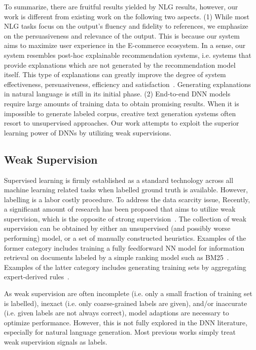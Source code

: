 \documentclass[sigconf]{acmart}
\begin{document}
To summarize, there are fruitful results yielded by NLG results, however, our work is different from existing work on the following two aspects. (1) While most NLG tasks focus on the output's fluency and fidelity to references, we emphasize on the persuasiveness and relevance of the output.  This is because our system aims to maximize user experience in the E-commerce ecosystem. In a sense, our system resembles post-hoc explainable recommendation systems, i.e.  systems that provide explanations which are not generated by the recommendation model itself. This type of explanations can greatly improve the degree of system effectiveness, persuasiveness, efficiency and satisfaction~\cite{Tintarev2011Designing}. Generating explanations in natural language is still in its initial phase. (2) End-to-end DNN models require large amounts of training data to obtain promising results. When it is impossible to generate labeled corpus, creative text generation systems often resort to unsupervised approaches. Our work attempts to exploit the superior learning power of DNNs by utilizing weak supervisions.

\subsection{Weak Supervision}
Supervised learning is firmly established as a standard technology across all machine learning related tasks when labelled ground truth is available. However, labelling is a labor costly procedure. To address the data scarcity issue, Recently, a significant amount of research has been proposed that aims to utilize weak supervision, which is the opposite of strong supervision~\cite{Zhou2018brief}. The collection of weak supervision can be obtained by either an unsupervised (and possibly worse performing) model, or a set of manually constructed heuristics. Examples of the former category includes training a fully feedforward NN model for information retrieval on documents labeled by a simple ranking model such as BM25~\cite{Dehghani2017Neural}. Examples of the latter category includes generating training sets by aggregating expert-derived rules~\cite{ratner2017snorkel}. 

As weak supervision are often 
incomplete (i.e. only a small fraction of training set is labelled), inexact (i.e. only coarse-grained labels are given), and/or inaccurate (i.e. given labels are not always correct), model adaptions are necessary to optimize performance. However, this is not fully explored in the DNN literature, especially for natural language generation. Most previous works simply 
treat weak supervision signals as labels. 
\end{document}
